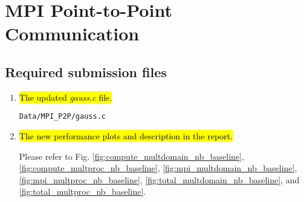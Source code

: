 \section{MPI Point-to-Point Communication}
\subsection{Required submission files}
\begin{enumerate}
	\item \hl{The updated \emph{gauss.c} file.}

		\verb!Data/MPI_P2P/gauss.c!

	\item \hl{The new performance plots and description in the report.}

		Please refer to Fig. \ref{fig:compute_multdomain_nb_baseline}, \ref{fig:compute_multproc_nb_baseline}, \ref{fig:mpi_multdomain_nb_baseline}, \ref{fig:mpi_multproc_nb_baseline}, \ref{fig:total_multdomain_nb_baseline}, and \ref{fig:total_multproc_nb_baseline}.

\end{enumerate}

